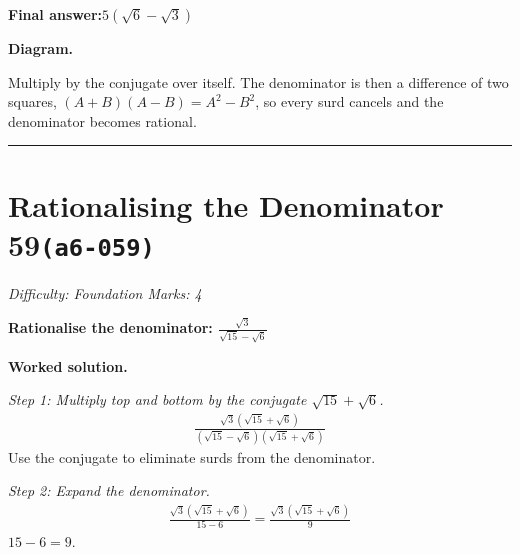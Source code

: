 \documentclass[11pt]{article}
\newcommand{\question}[1]{\par\medskip\noindent\textbf{#1}\par}
\begin{document}
\begin{answerbox}
\textbf{Final answer:}\quad \(\displaystyle 5(\sqrt{6} - \sqrt{3})\)
\end{answerbox}
\textbf{Diagram.}

\begin{center}
\end{center}
\small Multiply by the conjugate over itself. The denominator is then a difference of two squares, $(A+B)(A-B)=A^{2}-B^{2}$, so every surd cancels and the denominator becomes rational.\normalsize

\medskip\hrule

\section*{Rationalising the Denominator 59\quad\small\texttt{(a6-059)}}
\textit{Difficulty: Foundation \quad\textbar\quad Marks: 4}

\question{Rationalise the denominator: \( \frac{\sqrt{3}}{\sqrt{15} - \sqrt{6}} \)}

\textbf{Worked solution.}

\textit{Step 1: Multiply top and bottom by the conjugate \( \sqrt{15} + \sqrt{6} \).}
\[\begin{gathered}
\frac{\sqrt{3}(\sqrt{15} + \sqrt{6})}{(\sqrt{15} - \sqrt{6})(\sqrt{15} + \sqrt{6})}
\end{gathered}\]
Use the conjugate to eliminate surds from the denominator.

\textit{Step 2: Expand the denominator.}
\[\begin{gathered}
\frac{\sqrt{3}(\sqrt{15} + \sqrt{6})}{15 - 6} = \frac{\sqrt{3}(\sqrt{15} + \sqrt{6})}{9}
\end{gathered}\]
\( 15 - 6 = 9 \).
\end{document}
